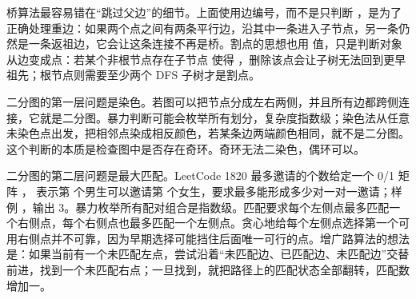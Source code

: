 桥算法最容易错在“跳过父边”的细节。上面使用边编号，而不是只判断 ，是为了正确处理重边：如果两个点之间有两条平行边，沿其中一条进入子节点，另一条仍然是一条返祖边，它会让这条连接不再是桥。割点的思想也用  值，只是判断对象从边变成点：若某个非根节点存在子节点  使得 ，删除该点会让子树无法回到更早祖先；根节点则需要至少两个 DFS 子树才是割点。

二分图的第一层问题是染色。若图可以把节点分成左右两侧，并且所有边都跨侧连接，它就是二分图。暴力判断可能会枚举所有划分，复杂度指数级；染色法从任意未染色点出发，把相邻点染成相反颜色，若某条边两端颜色相同，就不是二分图。这个判断的本质是检查图中是否存在奇环。奇环无法二染色，偶环可以。

二分图的第二层问题是最大匹配。LeetCode 1820 最多邀请的个数给定一个 0/1 矩阵 ， 表示第  个男生可以邀请第  个女生，要求最多能形成多少对一对一邀请；样例 ，输出 3。暴力枚举所有配对组合是指数级。匹配要求每个左侧点最多匹配一个右侧点，每个右侧点也最多匹配一个左侧点。贪心地给每个左侧点选择第一个可用右侧点并不可靠，因为早期选择可能挡住后面唯一可行的点。增广路算法的想法是：如果当前有一个未匹配左点，尝试沿着“未匹配边、已匹配边、未匹配边”交替前进，找到一个未匹配右点；一旦找到，就把路径上的匹配状态全部翻转，匹配数增加一。

